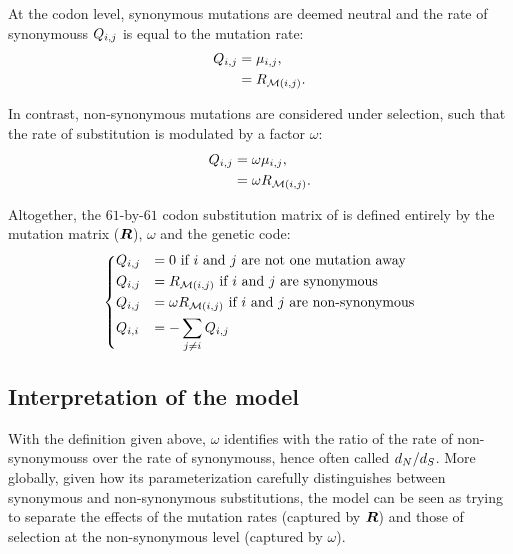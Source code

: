 At the \gls{codon} level, synonymous mutations are deemed \gls{neutral} and the rate of \glspl{synonymous} ${Q_{{i}, {j}}}$ is equal to the mutation rate:
\begin{align}
    Q_{{i}, {j}} & = \mu_{{i}, {j}}, \\
    & = R_{\mathcal{M}({i}, {j})}.
\end{align}

In contrast, non-synonymous mutations are considered under selection, such that the rate of substitution is modulated by a factor $\omega$:
\begin{align}
    Q_{{i}, {j}} & = \omega \mu_{{i}, {j}}, \\
    & = \omega R_{\mathcal{M}({i}, {j})}.
\end{align}

Altogether, the $61$-by-$61$ \gls{codon} \gls{substitution} matrix of \citet{Muse1994} is defined entirely by the mutation matrix ($\bm{R}$), $\omega$ and the genetic code:
\begin{equation}
    \begin{dcases}
        Q_{{i}, {j}} & = 0 \text{ if ${i}$ and ${j}$ are not one mutation away} \\
        Q_{{i}, {j}} & = R_{\mathcal{M}({i}, {j})} \text{ if ${i}$ and ${j}$ are synonymous} \\
        Q_{{i}, {j}} & = \omega R_{\mathcal{M}({i}, {j})} \text{ if ${i}$ and ${j}$ are non-synonymous} \\
        Q_{{i}, {i}} & = - \sum\limits_{{j} \neq {i}} Q_{{i}, {j}}
    \end{dcases}
    \label{eq:codon-models}
\end{equation}

\subsection{Interpretation of the model}
\label{subsec:interpretation-of-the-model}

With the definition given above, $\omega$ identifies with the ratio of the rate of \glspl{non-synonymous} over the rate of \glspl{synonymous}, hence often called $d_N / d_S$.
More globally, given how its parameterization carefully distinguishes between synonymous and non-synonymous substitutions, the model can be seen as trying to separate the effects of the mutation rates (captured by $\bm{R}$) and those of selection at the non-synonymous level (captured by $\omega$).

